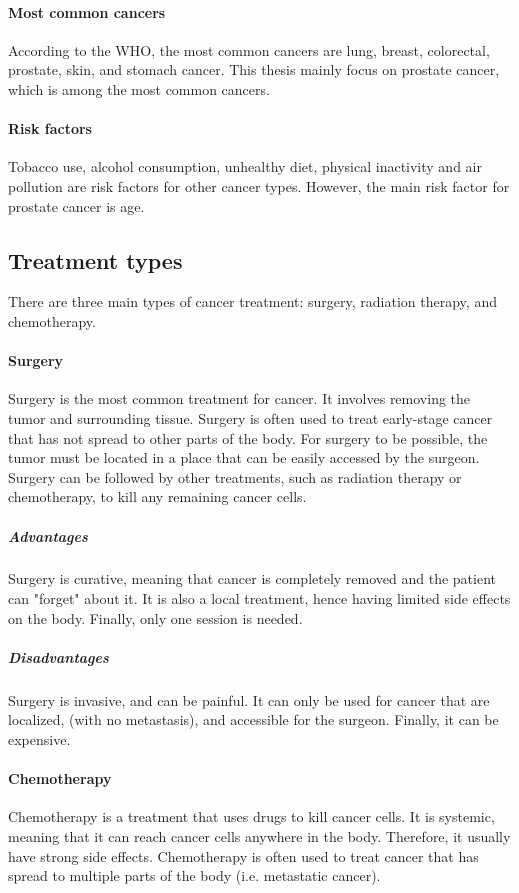 \paragraph{Most common cancers}
According to the WHO, the most common cancers are lung, breast, colorectal, prostate, skin, and stomach cancer.
This thesis mainly focus on prostate cancer, which is among the most common cancers.

\paragraph{Risk factors}
Tobacco use, alcohol consumption, unhealthy diet, physical inactivity and air pollution are risk factors for other cancer types.
However, the main risk factor for prostate cancer is age.

\subsection{Treatment types}

There are three main types of cancer treatment: surgery, radiation therapy, and chemotherapy.


\paragraph{Surgery}
Surgery is the most common treatment for cancer.
It involves removing the tumor and surrounding tissue.
Surgery is often used to treat early-stage cancer that has not spread to other parts of the body.
For surgery to be possible, the tumor must be located in a place that can be easily accessed by the surgeon.
Surgery can be followed by other treatments, such as radiation therapy or chemotherapy, to kill any remaining cancer cells.

\subparagraph{Advantages}
Surgery is curative, meaning that cancer is completely removed and the patient can "forget" about it.
It is also a local treatment, hence having limited side effects on the body.
Finally, only one session is needed.

\subparagraph{Disadvantages}
Surgery is invasive, and can be painful.
It can only be used for cancer that are localized, (with no metastasis), and accessible for the surgeon.
Finally, it can be expensive.

\paragraph{Chemotherapy}
Chemotherapy is a treatment that uses drugs to kill cancer cells.
It is systemic, meaning that it can reach cancer cells anywhere in the body.
Therefore, it usually have strong side effects.
Chemotherapy is often used to treat cancer that has spread to multiple parts of the body (i.e. metastatic cancer).

